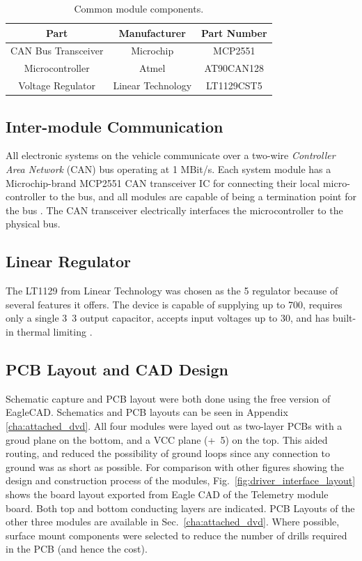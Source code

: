 \begin{table}[H]
	\caption{Common module components.}
	\label{tab:common_module_components}
	\centering
	\begin{tabular}{|c|c|c|}
		\hline 
		Part & Manufacturer & Part Number\tabularnewline 
		\hline \hline
		CAN Bus Transceiver & Microchip & MCP2551\tabularnewline \hline
		Microcontroller & Atmel & AT90CAN128\tabularnewline \hline
		Voltage Regulator & Linear Technology & LT1129CST5\tabularnewline		
		\hline
	\end{tabular}
\end{table}

\subsection{Inter-module Communication\label{sec:inter_module_communication}}

All electronic systems on the vehicle communicate over a two-wire \emph{Controller Area Network} (CAN) bus operating at 1 MBit/s. Each system module has a Microchip-brand MCP2551 CAN transceiver IC for connecting their local micro-controller to the bus, and all modules are capable of being a termination point for the bus \cite{MCP2551}. The CAN transceiver electrically interfaces the microcontroller to the physical bus.

\subsection{Linear Regulator}

The LT1129 from Linear Technology was chosen as the \unit{5}{\volt} regulator because of several features it offers. The device is capable of supplying up to \unit{700}{\milli\ampere}, requires only a single \unit{3.3}{\micro\farad} output capacitor, accepts input voltages up to \unit{30}{\volt}, and has built-in thermal limiting \cite{LTC1129}.

\subsection{PCB Layout and CAD Design}

Schematic capture and PCB layout were both done using the free version of EagleCAD. Schematics and PCB layouts can be seen in Appendix \ref{cha:attached_dvd}. All four modules were layed out as two-layer PCBs with a groud plane on the bottom, and a VCC plane (\unit{+5}{\volt}) on the top. This aided routing, and reduced the possibility of ground loops since any connection to ground was as short as possible. For comparison with other figures showing the design and construction process of the modules, Fig.\ \ref{fig:driver_interface_layout} shows the board layout exported from Eagle CAD of the Telemetry module board. Both top and bottom conducting layers are indicated. PCB Layouts of the other three modules are available in Sec.\ \ref{cha:attached_dvd}. Where possible, surface mount components were selected to reduce the number of drills required in the PCB (and hence the cost).

